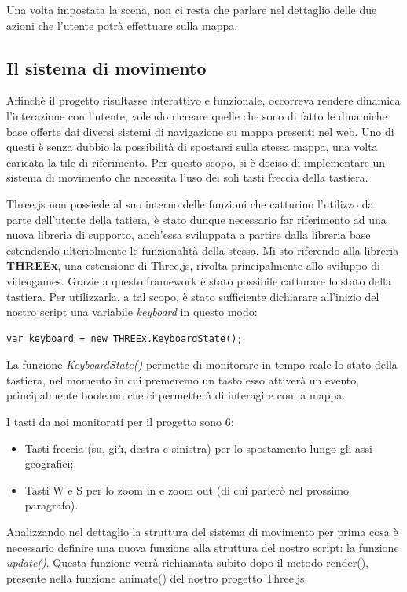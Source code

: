 Una volta impostata la scena, non ci resta che parlare nel dettaglio delle due azioni che l'utente potrà effettuare sulla mappa.

\subsection{Il sistema di movimento}
Affinchè il progetto risultasse interattivo e funzionale, occorreva rendere dinamica l'interazione con l'utente, volendo ricreare quelle che sono di fatto le dinamiche base offerte dai diversi sistemi di navigazione su mappa presenti nel web. Uno di questi è senza dubbio la possibilità di spostarsi sulla stessa mappa, una volta caricata la tile di riferimento. Per questo scopo, si è deciso di implementare un sistema di movimento che necessita l'uso dei soli tasti freccia della tastiera.

Three.js non possiede al suo interno delle funzioni che catturino l'utilizzo da parte dell'utente della tatiera, è stato dunque necessario far riferimento ad una nuova libreria di supporto, anch'essa sviluppata a partire dalla libreria base estendendo ulteriolmente le funzionalità della stessa. Mi sto riferendo alla libreria \textbf{THREEx}, una estensione di Three.js, rivolta principalmente allo sviluppo di videogames. Grazie a questo framework è stato possibile catturare lo stato della tastiera. Per utilizzarla, a tal scopo, è stato sufficiente dichiarare all'inizio del nostro script una variabile \textit{keyboard} in questo modo:
\begin{verbatim}
var keyboard = new THREEx.KeyboardState();
\end{verbatim}
La funzione \textit{KeyboardState()} permette di monitorare in tempo reale lo stato della tastiera, nel momento in cui premeremo un tasto esso attiverà un evento, principalmente booleano che ci permetterà di interagire con la mappa.

I tasti da noi monitorati per il progetto sono 6:
\begin{itemize}
	\item Tasti freccia (su, giù, destra e sinistra) per lo spostamento lungo gli assi geografici;
	\item Tasti W e S per lo zoom in e zoom out (di cui parlerò nel prossimo paragrafo).
\end{itemize}

Analizzando nel dettaglio la struttura del sistema di movimento per prima cosa è necessario definire una nuova funzione alla struttura del nostro script: la funzione \textit{update()}. Questa funzione verrà richiamata subito dopo il metodo render(), presente nella funzione animate() del nostro progetto Three.js.

